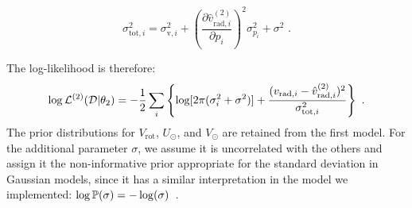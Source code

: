 \begin{equation}\label{eq:ErrorPropagation}
    \sigma^2_{\text{tot}, i} = \sigma^2_{\text{v},i} +  {\left( \frac{\partial \hat{v}^{(2)}_{\text{rad}, i}}{\partial p_i} \right)}^2 \sigma^2_{p_i} + \sigma^2 \text{ .}
\end{equation}

The log-likelihood is therefore:
\begin{equation}\label{Eq:LogLikeMod2}
    \log \mathbb{\mathcal{L}}^{(2)}(\mathcal{D} \vert \theta_2) = -\frac{1}{2}\sum_i\left\{\log[2\pi(\sigma_{i}^2+\sigma^2)]+\frac{(v_{\text{rad},i} - \hat{v}_{\text{rad},i}^{(2)})^2}{\sigma_{\text{tot}, i}^2}\right\} \text{ .}
\end{equation}
\noindent
The prior distributions for $V_{\text{rot}}$, $U_{\odot}$, and $V_{\odot}$ are retained from the first model. For the additional parameter $\sigma$, we assume it is uncorrelated with the others and assign it the non-informative prior appropriate for the standard deviation in Gaussian models, since it has a similar interpretation in the model we implemented: $\log \mathbb{P} (\sigma) = - \log(\sigma)$~\cite{mackay2003}.
